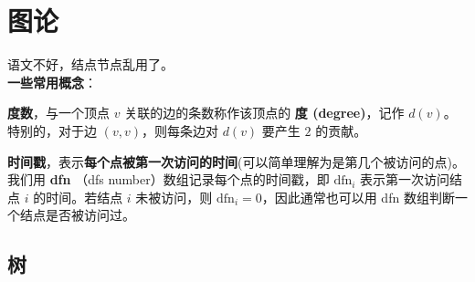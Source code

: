 \documentclass[11pt,oneside,a4paper,UTF8]{book}
\begin{document}
	
	\part{图论}
	语文不好，结点节点乱用了。\\
	\textbf{一些常用概念}：\par
	\textbf{度数}，与一个顶点 $v$ 关联的边的条数称作该顶点的 \textbf{度 (degree)}，记作 $d(v)$。特别的，对于边 $(v,v)$，则每条边对 $d(v)$ 要产生 $2$ 的贡献。\par
	\textbf{时间戳}，表示\textbf{每个点被第一次访问的时间}(可以简单理解为是第几个被访问的点)。我们用 \textbf{dfn} （dfs number）数组记录每个点的时间戳，即 $\text{dfn}_i$ 表示第一次访问结点 $i$ 的时间。若结点 $i$ 未被访问，则 $\text{dfn}_i = 0$，因此通常也可以用 dfn 数组判断一个结点是否被访问过。
	\chapter{树}
\end{document}
